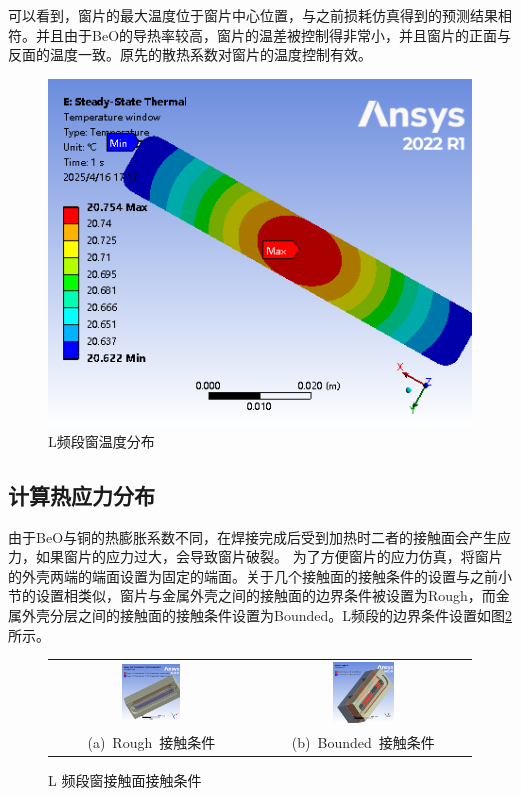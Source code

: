 \documentclass[master]{thesis-uestc}
\begin{document}
可以看到，窗片的最大温度位于窗片中心位置，与之前损耗仿真得到的预测结果相符。并且由于BeO的导热率较高，窗片的温差被控制得非常小，并且窗片的正面与反面的温度一致。原先的散热系数对窗片的温度控制有效。
\begin{figure}[!htb]
    \centering
    \includegraphics[width=0.4\linewidth]{pic/chapter4/L频段窗温度分布.png}
    \caption{L频段窗温度分布}
    \label{fig:L频段窗温度分布}
\end{figure}

\subsection{计算热应力分布}
由于BeO与铜的热膨胀系数不同，在焊接完成后受到加热时二者的接触面会产生应力，如果窗片的应力过大，会导致窗片破裂。
为了方便窗片的应力仿真，将窗片的外壳两端的端面设置为固定的端面。关于几个接触面的接触条件的设置与之前小节的设置相类似，窗片与金属外壳之间的接触面的边界条件被设置为Rough，而金属外壳分层之间的接触面的接触条件设置为Bounded。L频段的边界条件设置如图\ref{fig:L频段接触面边界条件}所示。
\begin{figure}[!htb]
    \small
    \centering
    \begin{tabular}{@{\ }c@{\ }c}
        \includegraphics[width=0.3\textwidth]{pic/chapter4/窗与金属外壳的Rough边界条件.png} & 
        \hspace{5pt}
        \includegraphics[width=0.3\textwidth]{pic/chapter4/金属外壳的Bounded边界条件.png}     \\
        \mbox{\small (a) Rough 接触条件}                                                                               & 
        \mbox{\small (b) Bounded 接触条件}                                                                                  \\
    \end{tabular}
    \caption{L 频段窗接触面接触条件}
    \label{fig:L频段接触面边界条件}
\end{figure}
\end{document}

